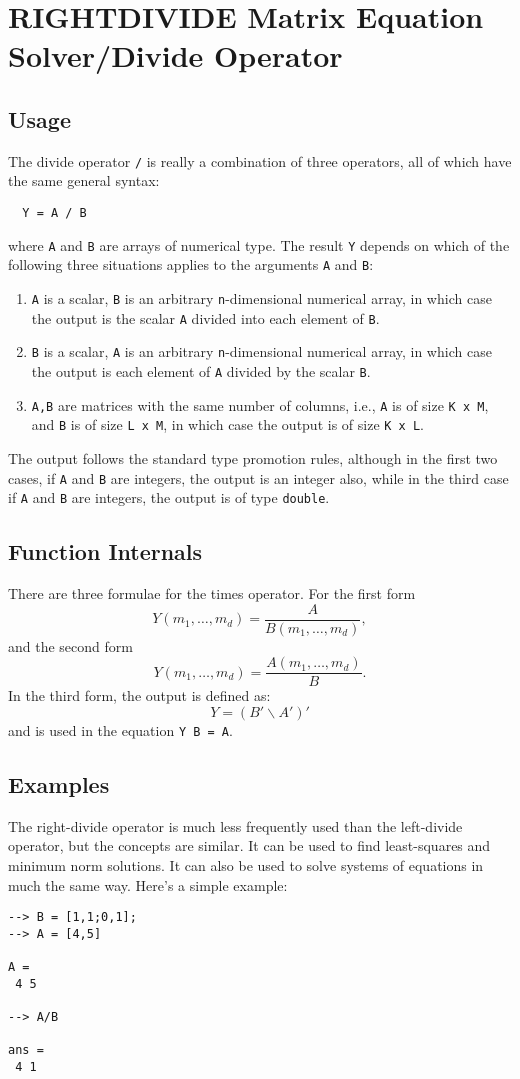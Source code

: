 \section{RIGHTDIVIDE Matrix Equation Solver/Divide Operator}

\subsection{Usage}

The divide operator \verb|/| is really a combination of three
operators, all of which have the same general syntax:
\begin{verbatim}
  Y = A / B
\end{verbatim}
where \verb|A| and \verb|B| are arrays of numerical type.  The result \verb|Y| depends
on which of the following three situations applies to the arguments
\verb|A| and \verb|B|:
\begin{enumerate}
  \item \verb|A| is a scalar, \verb|B| is an arbitrary \verb|n|-dimensional numerical array, in which case the output is the scalar \verb|A| divided into each element of \verb|B|.
  \item \verb|B| is a scalar, \verb|A| is an arbitrary \verb|n|-dimensional numerical array, in which case the output is each element of \verb|A| divided by the scalar \verb|B|.
  \item \verb|A,B| are matrices with the same number of columns, i.e., \verb|A| is of size \verb|K x M|, and \verb|B| is of size \verb|L x M|, in which case the output is of size \verb|K x L|.
\end{enumerate}
The output follows the standard type promotion rules, although in the first two cases, if \verb|A| and \verb|B| are integers, the output is an integer also, while in the third case if \verb|A| and \verb|B| are integers, the output is of type \verb|double|.

\subsection{Function Internals}

There are three formulae for the times operator.  For the first form
\[
Y(m_1,\ldots,m_d) = \frac{A}{B(m_1,\ldots,m_d)},
\]
and the second form
\[
Y(m_1,\ldots,m_d) = \frac{A(m_1,\ldots,m_d)}{B}.
\]
In the third form, the output is defined as:
\[
  Y = (B' \backslash A')'
\]
and is used in the equation \verb|Y B = A|.
\subsection{Examples}

The right-divide operator is much less frequently used than the left-divide operator, but the concepts are similar.  It can be used to find least-squares and minimum norm solutions.  It can also be used to solve systems of equations in much the same way.  Here's a simple example:
\begin{verbatim}
--> B = [1,1;0,1];
--> A = [4,5]

A = 
 4 5 

--> A/B

ans = 
 4 1 
\end{verbatim}
